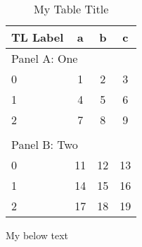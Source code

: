\begin{table}
\centering
\begin{threeparttable}
\caption{My Table Title}
\begin{tabular}{lccc}
\toprule
TL Label & a & b & c\\
\midrule
\multicolumn{4}{l}{Panel A: One}\\
0 & 1 & 2 & 3 \\
1 & 4 & 5 & 6 \\
2 & 7 & 8 & 9 \\
  &   &   &  \\
\multicolumn{4}{l}{Panel B: Two}\\
0 & 11 & 12 & 13 \\
1 & 14 & 15 & 16 \\
2 & 17 & 18 & 19 \\
\bottomrule

\end{tabular}
\begin{tablenotes}
My below text
\end{tablenotes}
\end{threeparttable}
\end{table}